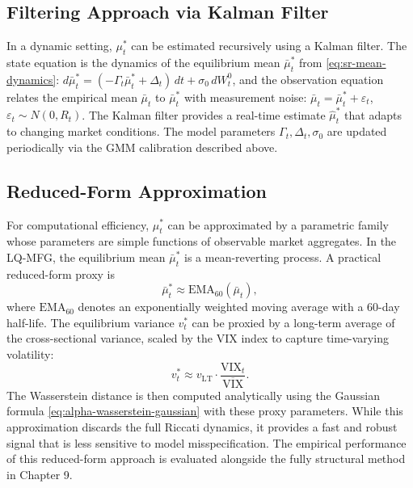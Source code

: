 \subsection{Filtering Approach via Kalman Filter}

In a dynamic setting, $\mu_t^*$ can be estimated recursively using a Kalman filter.
The state equation is the dynamics of the equilibrium mean $\bar\mu_t^*$ from
\eqref{eq:sr-mean-dynamics}: $d\bar\mu_t^* = (-\Gamma_t \bar\mu_t^* + \Delta_t)\,
dt + \sigma_0\, dW_t^0$, and the observation equation relates the empirical mean
$\bar\mu_t$ to $\bar\mu_t^*$ with measurement noise:
$\bar\mu_t = \bar\mu_t^* + \varepsilon_t$, $\varepsilon_t \sim N(0, R_t)$. The
Kalman filter provides a real-time estimate $\hat\mu_t^*$ that adapts to changing
market conditions. The model parameters $\Gamma_t, \Delta_t, \sigma_0$ are updated
periodically via the GMM calibration described above.

\subsection{Reduced-Form Approximation}

For computational efficiency, $\mu_t^*$ can be approximated by a parametric family
whose parameters are simple functions of observable market aggregates. In the
LQ-MFG, the equilibrium mean $\bar\mu_t^*$ is a mean-reverting process. A practical
reduced-form proxy is
\[
    \bar\mu_t^* \approx \mathrm{EMA}_{60}(\bar\mu_t),
\]
where $\mathrm{EMA}_{60}$ denotes an exponentially weighted moving average with a
60-day half-life. The equilibrium variance $v_t^*$ can be proxied by a long-term
average of the cross-sectional variance, scaled by the VIX index to capture
time-varying volatility:
\[
    v_t^* \approx v_{\mathrm{LT}} \cdot \frac{\mathrm{VIX}_t}{\overline{\mathrm{VIX}}}.
\]
The Wasserstein distance is then computed analytically using the Gaussian formula
\eqref{eq:alpha-wasserstein-gaussian} with these proxy parameters. While this
approximation discards the full Riccati dynamics, it provides a fast and robust
signal that is less sensitive to model misspecification. The empirical performance
of this reduced-form approach is evaluated alongside the fully structural method in
Chapter 9.

\begin{table}[ht]
\centering
\small
\caption{Comparison of Equilibrium Measure Estimation Methods}
\label{tab:estimation-methods}
\end{table}


